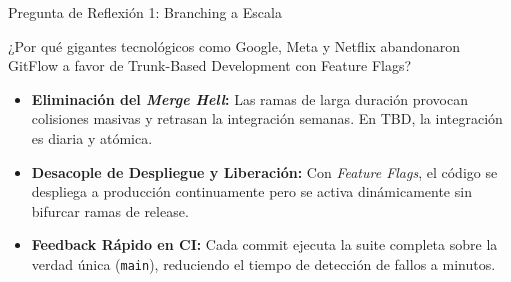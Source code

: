 \documentclass[aspectratio=169]{beamer}
\begin{document}
\begin{frame}{Pregunta de Reflexión 1: Branching a Escala}
  \begin{tcolorbox}[colback=cbBlue!8,colframe=cbBlue,arc=4pt,title=\textbf{Pregunta 1: Trunk-Based vs. GitFlow en Escala},coltitle=cbWhite,fonttitle=\bfseries\small,top=4pt,bottom=4pt,left=6pt,right=6pt]
    \small ¿Por qué gigantes tecnológicos como Google, Meta y Netflix abandonaron GitFlow a favor de Trunk-Based Development con Feature Flags?
  \end{tcolorbox}
  \vspace{0.2cm}
  \pause
  \begin{tcolorbox}[colback=cbGreen!10,colframe=cbGreen,arc=4pt,title=\textbf{Análisis y Respuesta de Ingeniería},coltitle=cbWhite,fonttitle=\bfseries\small,top=4pt,bottom=4pt,left=6pt,right=6pt]
    \footnotesize
    \begin{itemize}
      \setlength{\itemsep}{1.5pt}
      \item \textbf{Eliminación del \textit{Merge Hell}:} Las ramas de larga duración provocan colisiones masivas y retrasan la integración semanas. En TBD, la integración es diaria y atómica.
      \item \textbf{Desacople de Despliegue y Liberación:} Con \textit{Feature Flags}, el código se despliega a producción continuamente pero se activa dinámicamente sin bifurcar ramas de release.
      \item \textbf{Feedback Rápido en CI:} Cada commit ejecuta la suite completa sobre la verdad única (\texttt{main}), reduciendo el tiempo de detección de fallos a minutos.
    \end{itemize}
  \end{tcolorbox}
\end{frame}
\end{document}
